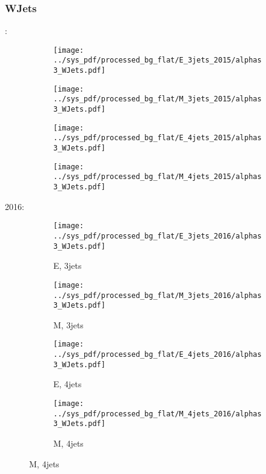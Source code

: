 \documentclass{beamer}
\begin{document}
\begin{frame}
\frametitle{WJets}
\fontsize{5}{1}:
\begin{figure}
\centering
\begin{subfigure}[b]{0.24\textwidth}
\texttt{[image: ../sys\_pdf/processed\_bg\_flat/E\_3jets\_2015/alphas3\_WJets.pdf]}
\end{subfigure}
\begin{subfigure}[b]{0.24\textwidth}
\texttt{[image: ../sys\_pdf/processed\_bg\_flat/M\_3jets\_2015/alphas3\_WJets.pdf]}
\end{subfigure}
\begin{subfigure}[b]{0.24\textwidth}
\texttt{[image: ../sys\_pdf/processed\_bg\_flat/E\_4jets\_2015/alphas3\_WJets.pdf]}
\end{subfigure}
\begin{subfigure}[b]{0.24\textwidth}
\texttt{[image: ../sys\_pdf/processed\_bg\_flat/M\_4jets\_2015/alphas3\_WJets.pdf]}
\end{subfigure}
\end{figure}
2016:
\begin{figure}
\centering
\begin{subfigure}[b]{0.24\textwidth}
\texttt{[image: ../sys\_pdf/processed\_bg\_flat/E\_3jets\_2016/alphas3\_WJets.pdf]}
\captionsetup{font=tiny}
\caption{E, 3jets}
\end{subfigure}
\begin{subfigure}[b]{0.24\textwidth}
\texttt{[image: ../sys\_pdf/processed\_bg\_flat/M\_3jets\_2016/alphas3\_WJets.pdf]}
\captionsetup{font=tiny}
\caption{M, 3jets}
\end{subfigure}
\begin{subfigure}[b]{0.24\textwidth}
\texttt{[image: ../sys\_pdf/processed\_bg\_flat/E\_4jets\_2016/alphas3\_WJets.pdf]}
\captionsetup{font=tiny}
\caption{E, 4jets}
\end{subfigure}
\begin{subfigure}[b]{0.24\textwidth}
\texttt{[image: ../sys\_pdf/processed\_bg\_flat/M\_4jets\_2016/alphas3\_WJets.pdf]}
\captionsetup{font=tiny}
\caption{M, 4jets}
\end{subfigure}
\end{figure}
\end{frame}
\end{document}
